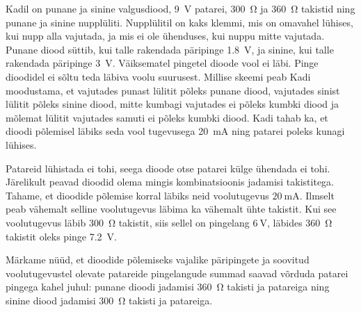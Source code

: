 
Kadil on punane ja sinine valgusdiood, \SI{9}{\V} patarei, \SI{300}{\ohm} ja \SI{360}{\ohm} takistid ning punane ja sinine nupplüliti. Nupplülitil on kaks klemmi, mis on omavahel lühises, kui nupp alla vajutada, ja mis ei ole ühenduses, kui nuppu mitte vajutada. Punane diood süttib, kui talle rakendada päripinge \SI{1.8}{\V}, ja sinine, kui talle rakendada päripinge \SI{3}{\V}. Väiksematel pingetel dioode vool ei läbi. Pinge dioodidel ei sõltu teda läbiva voolu suurusest. Millise skeemi peab Kadi moodustama, et vajutades punast lülitit põleks punane diood, vajutades sinist lülitit põleks sinine diood, mitte kumbagi vajutades ei põleks kumbki diood ja mõlemat lülitit vajutades samuti ei põleks kumbki diood. Kadi tahab ka, et dioodi põlemisel läbiks seda vool tugevusega \SI{20}{\mA} ning patarei poleks kunagi lühises.



\hint

\solu
Patareid lühistada ei tohi, seega dioode otse patarei külge ühendada ei tohi. Järelikult peavad dioodid olema mingis kombinatsioonis jadamisi takistitega. Tahame, et dioodide põlemise korral läbiks neid voolutugevus $\SI{20}{\mA}$. Ilmselt peab vähemalt selline voolutugevus läbima ka vähemalt ühte takistit. Kui see voolutugevus läbib \SI{300}{\ohm} takistit, siis sellel on pingelang $\SI{6}{\V}$, läbides \SI{360}{\ohm} takistit oleks pinge \SI{7.2}{\V}.

Märkame nüüd, et dioodide põlemiseks vajalike päripingete ja soovitud voolutugevustel olevate patareide pingelangude summad saavad võrduda patarei pingega kahel juhul: punane dioodi jadamisi \SI{360}{\ohm} takisti ja patareiga ning sinine diood jadamisi \SI{300}{\ohm} takisti ja patareiga.

